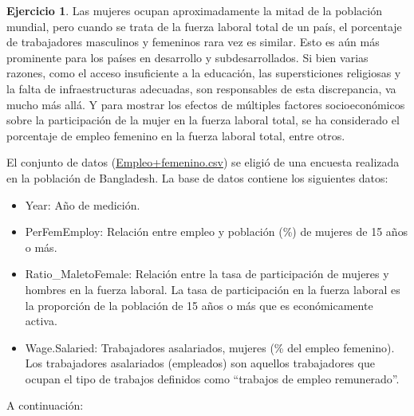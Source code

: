 \documentclass[
  11pt,
]{book}
\providecommand{\tightlist}{%
  \setlength{\itemsep}{0pt}\setlength{\parskip}{0pt}}
\theoremstyle{definition}
\theoremstyle{definition}
\theoremstyle{definition}
\newtheorem{exercise}{Ejercicio}[chapter]
\theoremstyle{definition}
\theoremstyle{remark}
\begin{document}
\begin{exercise}

Las mujeres ocupan aproximadamente la mitad de la población mundial, pero cuando se trata de la fuerza laboral total de un país, el porcentaje de trabajadores masculinos y femeninos rara vez es similar. Esto es aún más prominente para los países en desarrollo y subdesarrollados. Si bien varias razones, como el acceso insuficiente a la educación, las supersticiones religiosas y la falta de infraestructuras adecuadas, son responsables de esta discrepancia, va mucho más allá. Y para mostrar los efectos de múltiples factores socioeconómicos sobre la participación de la mujer en la fuerza laboral total, se ha considerado el porcentaje de empleo femenino en la fuerza laboral total, entre otros.

El conjunto de datos (\href{https://raw.githubusercontent.com/Dfranzani/Bases-de-datos-para-cursos/main/2023-1/Empleo\%2Bfemenino.csv}{Empleo+femenino.csv}) se eligió de una encuesta realizada en la población de Bangladesh. La base de datos contiene los siguientes datos:

\begin{itemize}
\tightlist
\item
  Year: Año de medición.
\item
  PerFemEmploy: Relación entre empleo y población (\%) de mujeres de 15 años o más.
\item
  Ratio\_MaletoFemale: Relación entre la tasa de participación de mujeres y hombres en la fuerza laboral. La tasa de participación en la fuerza laboral es la proporción de la población de 15 años o más que es económicamente activa.
\item
  Wage.Salaried: Trabajadores asalariados, mujeres (\% del empleo femenino). Los trabajadores asalariados (empleados) son aquellos trabajadores que ocupan el tipo de trabajos definidos como ``trabajos de empleo remunerado''.
\end{itemize}

A continuación:


\end{exercise}
\end{document}
